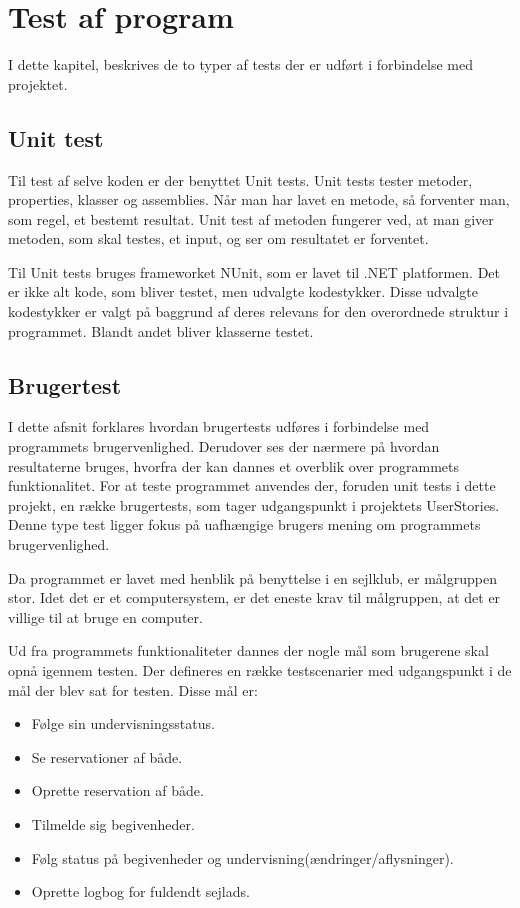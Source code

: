 \chapter{Test af program}\label{test_af_program}
I dette kapitel, beskrives de to typer af tests der er udført i forbindelse med projektet.

\section{Unit test}
Til test af selve koden er der benyttet Unit tests.
Unit tests tester metoder, properties, klasser og assemblies. 
Når man har lavet en metode, så forventer man, som regel, et bestemt resultat.
Unit test af metoden fungerer ved, at man giver metoden, som skal testes, et input, og ser om resultatet er forventet. 

Til Unit tests bruges frameworket NUnit, som er lavet til .NET platformen. 
Det er ikke alt kode, som bliver testet, men udvalgte kodestykker.
Disse udvalgte kodestykker er valgt på baggrund af deres relevans for den overordnede struktur i programmet. 
Blandt andet bliver klasserne testet.

\section{Brugertest}
I dette afsnit forklares hvordan brugertests udføres i forbindelse med programmets brugervenlighed.
Derudover ses der nærmere på hvordan resultaterne bruges, hvorfra der kan dannes et overblik over programmets funktionalitet. 
For at teste programmet anvendes der, foruden unit tests i dette projekt, en række brugertests, som tager udgangspunkt i projektets UserStories.
Denne type test ligger fokus på uafhængige brugers mening om programmets brugervenlighed.

Da programmet er lavet med henblik på benyttelse i en sejlklub, er målgruppen stor. 
Idet det er et computersystem, er det eneste krav til målgruppen, at det er villige til at bruge en computer.

Ud fra programmets funktionaliteter dannes der nogle mål som brugerene skal opnå igennem testen. 
Der defineres en række testscenarier med udgangspunkt i de mål der blev sat for testen.
Disse mål er:
\begin{itemize}
  \item Følge sin undervisningsstatus.
  \item Se reservationer af både.
  \item Oprette reservation af både.
  \item Tilmelde sig begivenheder.
  \item Følg status på begivenheder og undervisning(ændringer/aflysninger).
  \item Oprette logbog for fuldendt sejlads.
\end{itemize}

